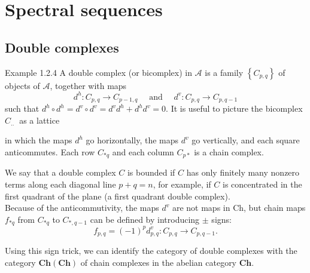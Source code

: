\section{Spectral sequences}



\subsection{Double complexes}
Example 1.2.4 A double complex (or bicomplex) in $\mathcal{A}$ is a family $\left\{C_{p, q}\right\}$ of objects of $\mathcal{A}$, together with maps
$$
d^h: C_{p, q} \rightarrow C_{p-1, q} \quad \text { and } \quad d^v: C_{p, q} \rightarrow C_{p, q-1}
$$
such that $d^h \circ d^h=d^v \circ d^v=d^v d^h+d^h d^v=0$. It is useful to picture the bicomplex $C_{\text {.. }}$ as a lattice 
    in which the maps $d^h$ go horizontally, the maps $d^v$ go vertically, and each square anticommutes. Each row $C_{* q}$ and each column $C_{p *}$ is a chain complex.

We say that a double complex $C$ is bounded if $C$ has only finitely many nonzero terms along each diagonal line $p+q=n$, for example, if $C$ is concentrated in the first quadrant of the plane (a first quadrant double complex).\\
Because of the anticommutivity, the maps $d^v$ are not maps in Ch, but chain maps $f_{* q}$ from $C_{* q}$ to $C_{*, q-1}$ can be defined by introducing $\pm$ signs:
$$
f_{p, q}=(-1)^p d_{p, q}^v: C_{p, q} \rightarrow C_{p, q-1} .
$$

Using this sign trick, we can identify the category of double complexes with the category $\mathbf{C h}(\mathbf{C h})$ of chain complexes in the abelian category $\mathbf{C h}$.\\

